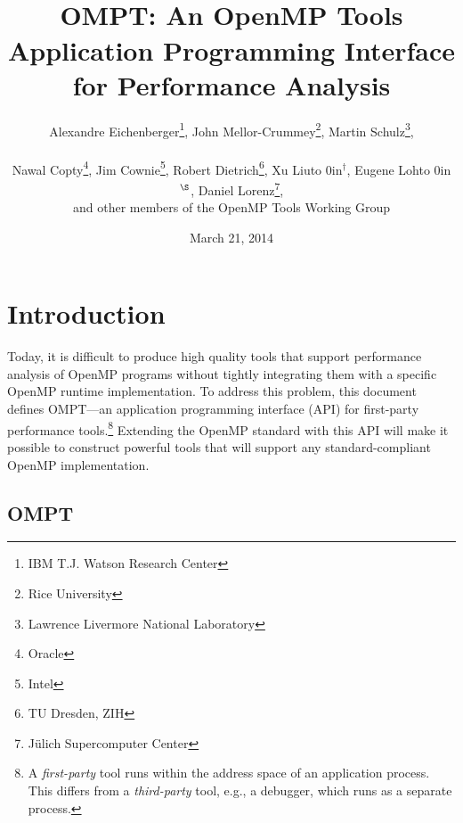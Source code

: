 \documentclass{article}
\title{OMPT: An OpenMP\textsuperscript{\textregistered} Tools Application Programming Interface for Performance Analysis}
\author{Alexandre Eichenberger\thanks{IBM T.J. Watson Research Center}, 
John Mellor-Crummey\thanks{Rice University}, 
Martin Schulz\thanks{Lawrence Livermore National Laboratory},
\\~\\
Nawal Copty\thanks{Oracle}, 
Jim Cownie\thanks{Intel},
Robert Dietrich\thanks{TU Dresden, ZIH},
Xu Liu\hbox to 0in{$^\dagger$\hss},
Eugene Loh\hbox to 0in{$^\S$\hss}, 
Daniel Lorenz\thanks{J\"{u}lich Supercomputer Center}, 
\\
and other members of the OpenMP Tools Working Group}
\date{March 21, 2014}
\begin{document}
     
\pagestyle{empty}

 
\setcounter{page}{1}
\pagestyle{plain}
                                           
\maketitle
\section{Introduction}
Today, it is difficult to produce high quality tools that support 
performance analysis of OpenMP programs without tightly integrating them with a specific OpenMP runtime implementation. To address this problem, this document defines OMPT---an application programming interface (API) for first-party performance tools.\footnote{A {\em first-party} tool runs within the address space of an application process. This differs from a {\em third-party} tool, e.g., a debugger, which runs as a separate process.}  
Extending the OpenMP standard with this API  will make it possible to construct powerful tools that will support any standard-compliant OpenMP implementation.

\subsection{OMPT}
\end{document}
